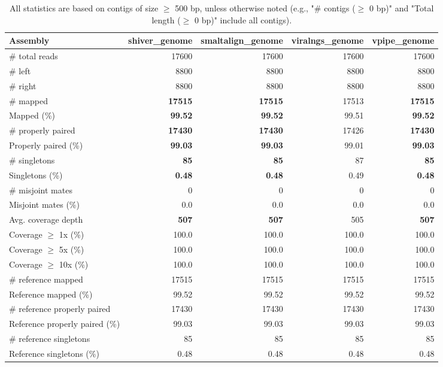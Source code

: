 \documentclass[12pt,a4paper]{article}
\begin{document}
\begin{table}[ht]
\begin{center}
\caption{All statistics are based on contigs of size $\geq$ 500 bp, unless otherwise noted (e.g., "\# contigs ($\geq$ 0 bp)" and "Total length ($\geq$ 0 bp)" include all contigs).}
\begin{tabular}{|l*{4}{|r}|}
\hline
Assembly & shiver\_genome & smaltalign\_genome & viralngs\_genome & vpipe\_genome \\ \hline
\# total reads & 17600 & 17600 & 17600 & 17600 \\ \hline
\# left & 8800 & 8800 & 8800 & 8800 \\ \hline
\# right & 8800 & 8800 & 8800 & 8800 \\ \hline
\# mapped & {\bf 17515} & {\bf 17515} & 17513 & {\bf 17515} \\ \hline
Mapped (\%) & {\bf 99.52} & {\bf 99.52} & 99.51 & {\bf 99.52} \\ \hline
\# properly paired & {\bf 17430} & {\bf 17430} & 17426 & {\bf 17430} \\ \hline
Properly paired (\%) & {\bf 99.03} & {\bf 99.03} & 99.01 & {\bf 99.03} \\ \hline
\# singletons & {\bf 85} & {\bf 85} & 87 & {\bf 85} \\ \hline
Singletons (\%) & {\bf 0.48} & {\bf 0.48} & 0.49 & {\bf 0.48} \\ \hline
\# misjoint mates & 0 & 0 & 0 & 0 \\ \hline
Misjoint mates (\%) & 0.0 & 0.0 & 0.0 & 0.0 \\ \hline
Avg. coverage depth & {\bf 507} & {\bf 507} & 505 & {\bf 507} \\ \hline
Coverage $\geq$ 1x (\%) & 100.0 & 100.0 & 100.0 & 100.0 \\ \hline
Coverage $\geq$ 5x (\%) & 100.0 & 100.0 & 100.0 & 100.0 \\ \hline
Coverage $\geq$ 10x (\%) & 100.0 & 100.0 & 100.0 & 100.0 \\ \hline
\# reference mapped & 17515 & 17515 & 17515 & 17515 \\ \hline
Reference mapped (\%) & 99.52 & 99.52 & 99.52 & 99.52 \\ \hline
\# reference properly paired & 17430 & 17430 & 17430 & 17430 \\ \hline
Reference properly paired (\%) & 99.03 & 99.03 & 99.03 & 99.03 \\ \hline
\# reference singletons & 85 & 85 & 85 & 85 \\ \hline
Reference singletons (\%) & 0.48 & 0.48 & 0.48 & 0.48 \\ \hline

\end{tabular}
\end{center}
\end{table}
\end{document}
